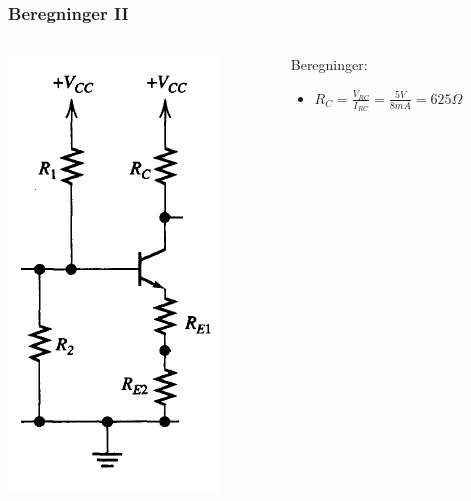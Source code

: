 \documentclass{beamer}
\begin{document}
\begin{frame}
	\frametitle{Beregninger II}
	\begin{columns}[onlytextwidth]
  \begin{column}{0.4\textwidth}
    \begin{center}
		\includegraphics[width=.8\textwidth]{images/trans_dc.png}
	\end{center}
  \end{column}
  \begin{column}{0.6\textwidth}
	Beregninger:
	\begin{itemize}
	\item $R_C = \frac{V_{RC}}{I_{RC}}= \frac{5V}{8mA} = 625\Omega$

\end{itemize}
\end{column}
\end{columns}
\end{frame}
\end{document}
